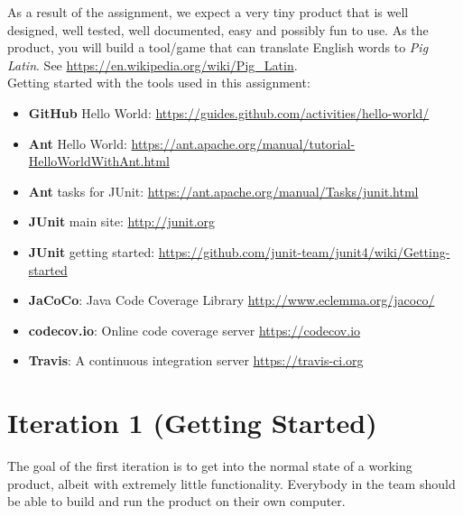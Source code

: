 \documentclass[swedish,english]{article}
\begin{document}
As a result of the assignment, we expect a very tiny product that is well designed, well tested, well documented, easy and possibly fun to use. As the product, you will build a tool/game that can translate English words to \emph{Pig Latin}. See \url{https://en.wikipedia.org/wiki/Pig_Latin}.\\

Getting started with the tools used in this assignment:
\begin{itemize}
\item \textbf{GitHub} Hello World: \url{https://guides.github.com/activities/hello-world/}
\item \textbf{Ant} Hello World: \url{https://ant.apache.org/manual/tutorial-HelloWorldWithAnt.html}
\item \textbf{Ant} tasks for JUnit: \url{https://ant.apache.org/manual/Tasks/junit.html}
\item \textbf{JUnit} main site: \url{http://junit.org}
\item \textbf{JUnit} getting started: \url{https://github.com/junit-team/junit4/wiki/Getting-started}
\item \textbf{JaCoCo}: Java Code Coverage Library \url{http://www.eclemma.org/jacoco/}
\item \textbf{codecov.io}: Online code coverage server \url{https://codecov.io}
\item \textbf{Travis}: A continuous integration server \url{https://travis-ci.org}
\end{itemize}

\newpage

\section*{Iteration 1 (Getting Started)}
The goal of the first iteration is to get into the normal state of a working product, albeit with extremely little functionality. Everybody in the team should be able to build and run the product on their own computer.
\end{document}
